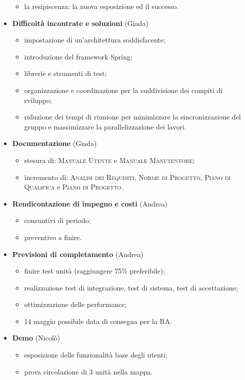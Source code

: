 \begin{itemize}
\begin{itemize}
		\item la resipiscenza: la nuova esposizione ed il successo.
	\end{itemize}
	\item \textbf{Difficoltà incontrate e soluzioni} (Giada)
	\begin{itemize}
		\item impostazione di un'architettura soddisfacente;
		\item introduzione del framework Spring;
		\item librerie e strumenti di test;
		\item organizzazione e coordinazione per la suddivisione dei compiti di sviluppo;
		\item riduzione dei tempi di riunione per minimizzare la sincronizzazione del gruppo e massimizzare la parallelizzazione dei lavori.
	\end{itemize}
	\item \textbf{Documentazione} (Giada)
	\begin{itemize}
		\item stesura di: \textsc{Manuale Utente} e \textsc{Manuale Manutentore};
		\item incremento di: \textsc{Analisi dei Requisiti}, \textsc{Norme di Progetto}, \textsc{Piano di Qualifica} e \textsc{Piano di Progetto}.
	\end{itemize}
	\item \textbf{Rendicontazione di impegno e costi} (Andrea)
	\begin{itemize}
		\item consuntivi di periodo;
		\item preventivo a finire.
	\end{itemize}
	\item \textbf{Previsioni di completamento} (Andrea)
	\begin{itemize}
		\item finire test unità (raggiungere 75\% preferibile);
		\item realizzazione test di integrazione, test di sistema, test di accettazione;
		\item ottimizzazione delle performance;
		\item 14 maggio possibile data di consegna per la RA.
	\end{itemize}
	\item \textbf{Demo} (Nicolò)
	\begin{itemize}
		\item esposizione delle funzionalità base degli utenti;
		\item prova circolazione di 3 unità nella mappa.
	\end{itemize}


\end{itemize}

